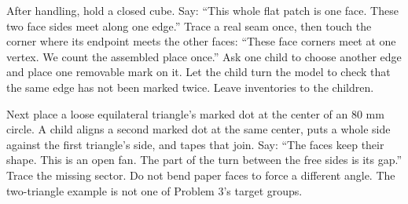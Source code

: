 \documentclass[11pt,letterpaper]{article}
\newcommand{\sub}[1]{\par\vspace{3pt}{\bfseries #1}\par}
\begin{document}
\sub{Two or three minutes with actual assembled objects}
After handling, hold a closed cube. Say: ``This whole flat patch is one face. These two face sides meet along one edge.'' Trace a real seam once, then touch the corner where its endpoint meets the other faces: ``These face corners meet at one vertex. We count the assembled place once.'' Ask one child to choose another edge and place one removable mark on it. Let the child turn the model to check that the same edge has not been marked twice. Leave inventories to the children.

Next place a loose equilateral triangle's marked dot at the center of an 80 mm circle. A child aligns a second marked dot at the same center, puts a whole side against the first triangle's side, and tapes that join. Say: ``The faces keep their shape. This is an open fan. The part of the turn between the free sides is its gap.'' Trace the missing sector. Do not bend paper faces to force a different angle. The two-triangle example is not one of Problem 3's target groups.

\begin{center}
\end{center}
\end{document}
